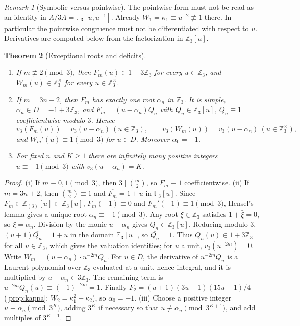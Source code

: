 \documentclass[11pt,reqno]{amsart}
\newtheorem{theorem}{Theorem}[section]
\theoremstyle{definition}
\theoremstyle{remark}
\newtheorem{remark}[theorem]{Remark}
\theoremstyle{plain}
\newcommand{\Z}{\mathbb Z}
\newcommand{\F}{\mathbb F}
\newcommand{\Zloc}{\mathbb Z_{(3)}}
\begin{document}
\begin{remark}[Symbolic versus pointwise]\label{rem:laurent}
The pointwise form must not be read as an identity in $A/3A=\F_3[u,u^{-1}]$. Already $W_1=\kappa_1\equiv u^{-2}\not\equiv1$ there. In particular the pointwise congruence must not be differentiated with respect to $u$. Derivatives are computed below from the factorization in $\Z_3[u]$.
\end{remark}

\begin{theorem}[Exceptional roots and deficits]\label{thm:roots}
\leavevmode
\begin{enumerate}[label=\textup{(\roman*)}]
\item If $m\not\equiv2\pmod3$, then $F_m(u)\in1+3\Z_3$ for every $u\in\Z_3$, and $W_m(u)\in\Z_3^\times$ for every $u\in\Z_3^\times$.
\item If $m=3n+2$, then $F_m$ has exactly one root $\alpha_n$ in $\Z_3$. It is simple, $\alpha_n\in D=-1+3\Z_3$, and $F_m=(u-\alpha_n)Q_n$ with $Q_n\in\Z_3[u]$, $Q_n\equiv1$ coefficientwise modulo $3$. Hence
\[
v_3(F_m(u))=v_3(u-\alpha_n)\ (u\in\Z_3),\qquad v_3(W_m(u))=v_3(u-\alpha_n)\ (u\in\Z_3^\times),
\]
and $W_m'(u)\equiv1\pmod3$ for $u\in D$. Moreover $\alpha_0=-1$.
\item For fixed $n$ and $K\ge1$ there are infinitely many positive integers $u\equiv-1\pmod3$ with $v_3(u-\alpha_n)=K$.
\end{enumerate}
\end{theorem}

\begin{proof}
(i) If $m\equiv0,1\pmod3$, then $3\mid\binom m2$, so $F_m\equiv1$ coefficientwise. (ii) If $m=3n+2$, then $\binom m2\equiv1$ and $\overline{F_m}=1+u$ in $\F_3[u]$. Since $F_m\in\Zloc[u]\subset\Z_3[u]$, $F_m(-1)\equiv0$ and $F_m'(-1)\equiv1\pmod 3$, Hensel's lemma \cite[Ch.~I, \S6.4]{Robert2000} gives a unique root $\alpha_n\equiv-1\pmod 3$. Any root $\xi\in\Z_3$ satisfies $1+\bar\xi=0$, so $\xi=\alpha_n$. Division by the monic $u-\alpha_n$ gives $Q_n\in\Z_3[u]$. Reducing modulo $3$, $(u+1)\overline{Q_n}=1+u$ in the domain $\F_3[u]$, so $\overline{Q_n}=1$. Thus $Q_n(u)\in1+3\Z_3$ for all $u\in\Z_3$, which gives the valuation identities; for $u$ a unit, $v_3(u^{-2m})=0$. Write $W_m=(u-\alpha_n)\cdot u^{-2m}Q_n$. For $u\in D$, the derivative of $u^{-2m}Q_n$ is a Laurent polynomial over $\Z_3$ evaluated at a unit, hence integral, and it is multiplied by $u-\alpha_n\in3\Z_3$. The remaining term is $u^{-2m}Q_n(u)\equiv(-1)^{-2m}=1$. Finally $F_2=(u+1)(3u-1)(15u-1)/4$ (\cref{prop:kappa}: $W_2=\kappa_1^2+\kappa_2$), so $\alpha_0=-1$. (iii) Choose a positive integer $u\equiv\alpha_n\pmod{3^K}$, adding $3^K$ if necessary so that $u\not\equiv\alpha_n\pmod{3^{K+1}}$, and add multiples of $3^{K+1}$.
\end{proof}
\end{document}
